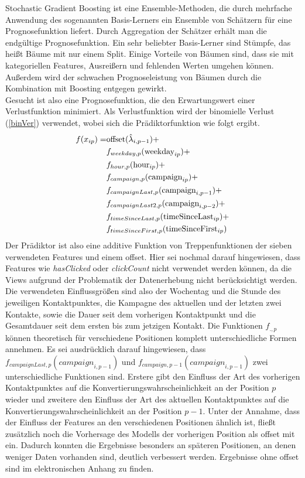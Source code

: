 Stochastic Gradient Boosting ist eine Ensemble-Methoden, die durch mehrfache Anwendung des sogenannten Basis-Lerners ein Ensemble von Schätzern für eine Prognosefunktion liefert. Durch Aggregation der Schätzer erhält man die endgültige Prognosefunktion. Ein sehr beliebter Basis-Lerner sind Stümpfe, das heißt Bäume mit nur einem Split. Einige Vorteile von Bäumen sind, dass sie mit kategoriellen Features, Ausreißern und fehlenden Werten umgehen können. Außerdem wird der schwachen Prognoseleistung von Bäumen durch die Kombination mit Boosting entgegen gewirkt.\\
Gesucht ist also eine Prognosefunktion, die den Erwartungswert einer Verlustfunktion minimiert. Als Verlustfunktion wird der binomielle Verlust (\ref{binVer}) verwendet, wobei sich die Prädiktorfunktion wie folgt ergibt.
\begin{align}
	f(x_{ip}) =& \text{offset}(\hat{\lambda}_{i,p-1}) + \notag \\
						 &f_{weekday,p}(\text{weekday}_{ip}) + \notag \\
						 &f_{hour,p}(\text{hour}_{ip}) + \notag \\
						 &f_{campaign,p}(\text{campaign}_{ip}) + \notag \\
						 &f_{campaignLast,p}(\text{campaign}_{i,p-1}) + \notag \\
						 &f_{campaignLast2,p}(\text{campaign}_{i,p-2}) + \notag \\
						 &f_{timeSinceLast,p}(\text{timeSinceLast}_{ip}) + \notag \\
						 &f_{timeSinceFirst,p}(\text{timeSinceFirst}_{ip}) \label{praediktor}
\end{align}
Der Prädiktor ist also eine additive Funktion von Treppenfunktionen der sieben verwendeten Features und einem offset. Hier sei nochmal darauf hingewiesen, dass Features wie \textit{hasClicked} oder \textit{clickCount} nicht verwendet werden können, da die Views aufgrund der Problematik der Datenerhebung nicht berücksichtigt werden. Die verwendeten Einflussgrößen sind also der Wochentag und die Stunde des jeweiligen Kontaktpunktes, die Kampagne des aktuellen und der letzten zwei Kontakte, sowie die Dauer seit dem vorherigen Kontaktpunkt und die Gesamtdauer seit dem ersten bis zum jetzigen Kontakt. Die Funktionen $f_{.,p}$ können theoretisch für verschiedene Positionen komplett unterschiedliche Formen annehmen. Es sei ausdrücklich darauf hingewiesen, dass $f_{campaignLast,p}(\textit{campaign}_{i,p-1})$ und $f_{campaign,p-1}(\textit{campaign}_{i,p-1})$ zwei unterschiedliche Funktionen sind. Erstere gibt den Einfluss der Art des vorherigen Kontaktpunktes auf die Konvertierungswahrscheinlichkeit an der Position $p$ wieder und zweitere den Einfluss der Art des aktuellen Kontaktpunktes auf die Konvertierungswahrscheinlichkeit an der Position $p-1$. Unter der Annahme, dass der Einfluss der Features an den verschiedenen Positionen ähnlich ist, fließt zusätzlich noch die Vorhersage des Modells der vorherigen Position als offset mit ein. Dadurch konnten die Ergebnisse besonders an späteren Positionen, an denen weniger Daten vorhanden sind, deutlich verbessert werden. Ergebnisse ohne offset sind im elektronischen Anhang zu finden.\\

